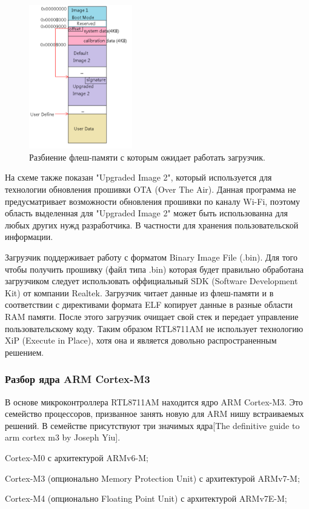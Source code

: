 \begin{figure}[h!]
    \centering
    \includegraphics[width=0.4\textwidth]{rtl8711am_flash_layout.png}
    \caption{Разбиение флеш-памяти с которым ожидает работать загрузчик.}
\end{figure}

На схеме также показан "Upgraded Image 2", который используется для технологии обновления прошивки OTA (Over The Air). Данная программа не предусматривает возможности обновления прошивки по каналу Wi-Fi, поэтому область выделенная для "Upgraded Image 2" может быть использованна для любых других нужд разработчика. В частности для хранения пользовательской информации.


Загрузчик поддерживает работу с форматом Binary Image File (.bin). Для того чтобы получить прошивку (файл типа .bin) которая будет правильно обработана загрузчиком следует использовать оффициальный SDK (Software Development Kit) от компании Realtek. Загрузчик читает данные из флеш-памяти и в соответствии с директивами формата ELF копирует данные в разные области RAM памяти. После этого загрузчик очищает свой стек и передает управление пользовательскому коду. Таким образом RTL8711AM не использует технологию XiP (Execute in Place), хотя она и является довольно распространенным решением.

\subsubsection{ Разбор ядра ARM Cortex-M3 }
В основе микроконтроллера RTL8711AM находится ядро ARM Cortex-M3. Это семейство процессоров, призванное занять новую для ARM нишу встраиваемых решений. В семействе присутствуют три значимых ядра[The definitive guide to arm cortex m3 by Joseph Yiu].

\begin{my_enumerate}
\item Cortex-M0 с архитектурой ARMv6-M;
\item Cortex-M3 (опционально Memory Protection Unit) с архитектурой ARMv7-M;
\item Cortex-M4 (опционально Floating Point Unit) с архитектурой ARMv7E-M;
\end{my_enumerate}

